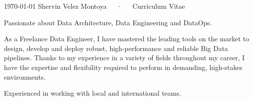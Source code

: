 \documentclass[11pt, a4paper]{awesome-cv}
\begin{document}
\makecvheader
\makecvfooter
{\today}
{Shervin Velez Montoya~~~·~~~Curriculum Vitae}
{}


\begin{cvparagraph}
    Passionate about Data Architecture, Data Engineering and DataOps.

    As a Freelance Data Engineer, I have mastered the leading tools on the market to design, develop and deploy robust, high-performance and reliable Big Data pipelines. Thanks to my experience in a variety of fields throughout my career,
    I have the expertise and flexibility required to perform in demanding, high-stakes environments.
    
    Experienced in working with local and international teams.
\end{cvparagraph}





\end{document}
